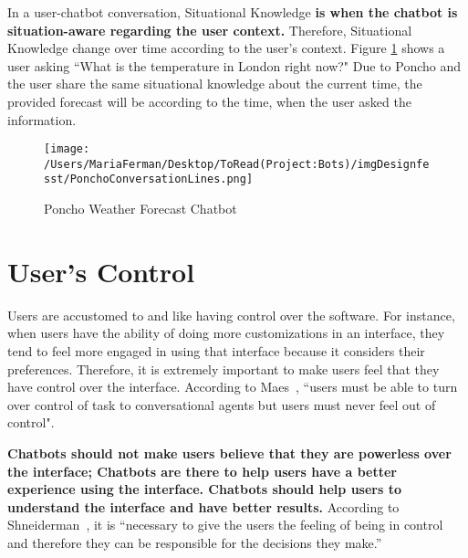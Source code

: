 \documentclass[a4paper,10pt]{article}
\begin{document}
In a user-chatbot conversation, Situational Knowledge \textbf{is when the chatbot is situation-aware regarding the user context.} Therefore, Situational Knowledge change over time according to the user's context. Figure \ref{FigurePoncho} shows a user asking ``What is the temperature in London right now?" Due to Poncho and the user share the same situational knowledge about the current time, the provided forecast will be according to the time, when the user asked the information. 


\begin{figure}
\centering
\texttt{[image: /Users/MariaFerman/Desktop/ToRead(Project:Bots)/imgDesignfesst/PonchoConversationLines.png]}
\caption{Poncho Weather Forecast Chatbot}
\label{FigurePoncho}
\end{figure}
\section{User's Control}

Users are accustomed to and like having control over the software. For instance, when users have the ability of doing more customizations in an interface, they tend to feel more engaged in using that interface because it considers their preferences. Therefore, it is extremely important to make users feel that they have control over the interface. According to Maes~\cite{shneiderman1997direct}, ``users must be able to turn over control of task to conversational agents but users must never feel out of control".

\textbf{Chatbots should not make users believe that they are powerless over the interface; Chatbots are there to help users have a better experience using the interface. Chatbots should help users to understand the interface and have better results.} According to Shneiderman~\cite{shneiderman1997direct}, it is ``necessary to give the users the feeling of being in control and therefore they can be responsible for the decisions they make.” 
\end{document}
